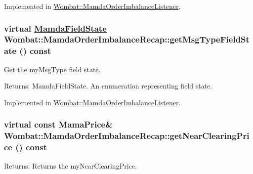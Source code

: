 Implemented in \hyperlink{classWombat_1_1MamdaOrderImbalanceListener_041c934f699fe71fb16d9154bc444bf0}{Wombat::Mamda\-Order\-Imbalance\-Listener}.\hypertarget{classWombat_1_1MamdaOrderImbalanceRecap_458ec8a6c2f84a218af924a747f1a410}{
\subsubsection[getMsgTypeFieldState]{\setlength{\rightskip}{0pt plus 5cm}virtual \hyperlink{namespaceWombat_93aac974f2ab713554fd12a1fa3b7d2a}{Mamda\-Field\-State} Wombat::Mamda\-Order\-Imbalance\-Recap::get\-Msg\-Type\-Field\-State () const}}
\label{classWombat_1_1MamdaOrderImbalanceRecap_458ec8a6c2f84a218af924a747f1a410}


Get the my\-Msg\-Type field state. 

\begin{Desc}
\item[Returns:]Mamda\-Field\-State. An enumeration representing field state. \end{Desc}


Implemented in \hyperlink{classWombat_1_1MamdaOrderImbalanceListener_69ecc694f33d3fb39064a3fa1b0d8ef3}{Wombat::Mamda\-Order\-Imbalance\-Listener}.\hypertarget{classWombat_1_1MamdaOrderImbalanceRecap_b9c9fff21f52344038f8b2aca1a5e672}{
\subsubsection[getNearClearingPrice]{\setlength{\rightskip}{0pt plus 5cm}virtual const Mama\-Price\& Wombat::Mamda\-Order\-Imbalance\-Recap::get\-Near\-Clearing\-Price () const}}
\label{classWombat_1_1MamdaOrderImbalanceRecap_b9c9fff21f52344038f8b2aca1a5e672}


\begin{Desc}
\item[Returns:]Returns the my\-Near\-Clearing\-Price. \end{Desc}


